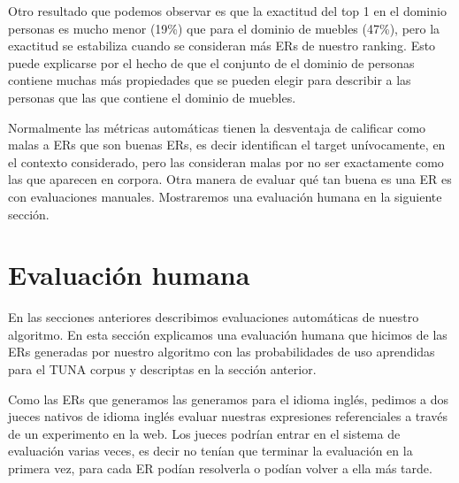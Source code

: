
Otro resultado que podemos observar es que la exactitud  del top 1 en el dominio personas es mucho menor (19\%) que para el dominio de muebles (47\%), pero la exactitud se estabiliza cuando se consideran m\'as ERs de nuestro ranking. Esto puede explicarse por el hecho de que el conjunto de el dominio de personas contiene muchas m\'as propiedades que se pueden elegir para describir a las personas que las que contiene el dominio de muebles.

Normalmente las m\'etricas autom\'aticas tienen la desventaja de calificar como malas a ERs que son buenas ERs, es decir identifican el target un\'ivocamente, en el contexto considerado, pero las consideran malas por no ser exactamente como las que aparecen en corpora. Otra manera de evaluar qu\'e tan buena es una ER es con evaluaciones manuales. Mostraremos una evaluaci\'on humana en la siguiente secci\'on.

 
\section{Evaluaci\'on humana} \label{sec:humanevaluation}

En las secciones anteriores describimos evaluaciones autom\'aticas de nuestro algoritmo. En esta secci\'on explicamos una evaluaci\'on humana que hicimos de las ERs generadas por nuestro algoritmo con las probabilidades de uso aprendidas para el TUNA corpus y descriptas en la secci\'on anterior.  

Como las ERs que generamos las generamos para el idioma ingl\'es, pedimos a dos jueces nativos de idioma ingl\'es evaluar nuestras expresiones referenciales a trav\'es de un experimento en la web. Los jueces podr\'{i}an entrar en el sistema de evaluaci\'on varias veces, es decir no ten\'ian que terminar la evaluaci\'on en la primera vez, para cada ER pod\'ian resolverla o pod\'ian volver a ella m\'as tarde. 

